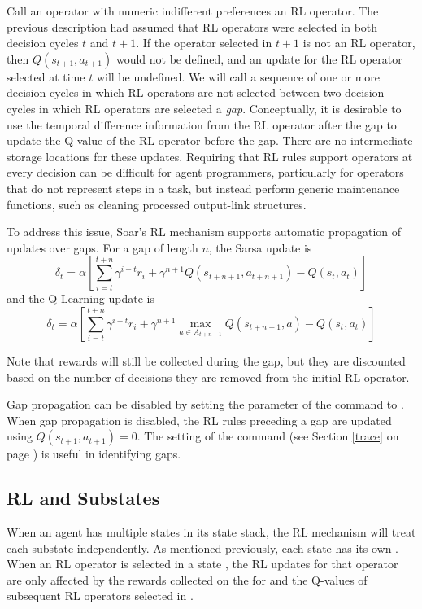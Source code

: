 Call an operator with numeric indifferent preferences an RL operator.
The previous description had assumed that RL operators were selected in both decision cycles $t$ and $t+1$.
If the operator selected in $t+1$ is not an RL operator, then $Q(s_{t+1}, a_{t+1})$ would not be defined, and an update for the RL operator selected at time $t$ will be undefined.
We will call a sequence of one or more decision cycles in which RL operators are not selected between two decision cycles in which RL operators are selected a \emph{gap}.
Conceptually, it is desirable to use the temporal difference information from the RL operator after the gap to update the Q-value of the RL operator before the gap.
There are no intermediate storage locations for these updates.
Requiring that RL rules support operators at every decision can be difficult for agent programmers, particularly for operators that do not represent steps in a task, but instead perform generic maintenance functions, such as cleaning processed output-link structures.

To address this issue, Soar's RL mechanism supports automatic propagation of updates over gaps.
For a gap of length $n$, the Sarsa update is
$$\delta_t = \alpha \left[ \sum_{i=t}^{t+n}{\gamma^{i-t} r_i} + \gamma^{n+1} Q(s_{t+n+1}, a_{t+n+1}) - Q(s_t, a_t) \right]$$
and the Q-Learning update is
$$\delta_t = \alpha \left[ \sum_{i=t}^{t+n}{\gamma^{i-t} r_i} + \gamma^{n+1} \underset{a \in A_{t+n+1}}{\max} Q(s_{t+n+1}, a) - Q(s_t, a_t) \right]$$

Note that rewards will still be collected during the gap, but they are discounted based on the number of decisions they are removed from the initial RL operator.

Gap propagation can be disabled by setting the  parameter of the  command to .
When gap propagation is disabled, the RL rules preceding a gap are updated using $Q(s_{t+1}, a_{t+1}) = 0$.
The  setting of the  command (see Section \ref{trace} on page \pageref{trace}) is useful in identifying gaps.


\subsection{RL and Substates}
\label{RL-substates}

When an agent has multiple states in its state stack, the RL mechanism will treat each substate independently.
As mentioned previously, each state has its own .
When an RL operator is selected in a state , the RL updates for that operator are only affected by the rewards collected on the  for  and the Q-values of subsequent RL operators selected in .


